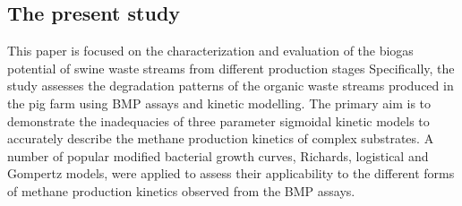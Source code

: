 \subsection{The present study}
This paper is focused on the characterization and evaluation of the biogas potential of swine waste streams from different production stages  Specifically, the study assesses the degradation patterns of the organic waste streams produced in the pig farm using BMP assays and kinetic modelling. The primary aim is to demonstrate the inadequacies of three parameter sigmoidal kinetic models to accurately describe the methane production kinetics of complex substrates. A number of popular modified bacterial growth curves, Richards, logistical and Gompertz models, were applied to assess their applicability to the different forms of methane production kinetics observed from the BMP assays.